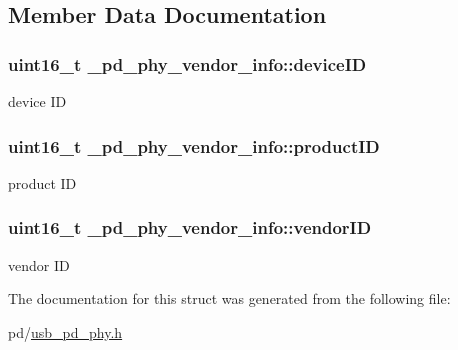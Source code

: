 \subsection{Member Data Documentation}
\hypertarget{struct__pd__phy__vendor__info_a356dba0c0968b8a08fee4477f561ea46}{
\subsubsection[{device\-I\-D}]{\setlength{\rightskip}{0pt plus 5cm}uint16\-\_\-t \-\_\-pd\-\_\-phy\-\_\-vendor\-\_\-info\-::device\-I\-D}}\label{struct__pd__phy__vendor__info_a356dba0c0968b8a08fee4477f561ea46}
device I\-D \hypertarget{struct__pd__phy__vendor__info_a4bd651a05bc50ad4e045b7956ba6f43b}{
\subsubsection[{product\-I\-D}]{\setlength{\rightskip}{0pt plus 5cm}uint16\-\_\-t \-\_\-pd\-\_\-phy\-\_\-vendor\-\_\-info\-::product\-I\-D}}\label{struct__pd__phy__vendor__info_a4bd651a05bc50ad4e045b7956ba6f43b}
product I\-D \hypertarget{struct__pd__phy__vendor__info_a271bbac00bad57c93a70cfb905bb2d98}{
\subsubsection[{vendor\-I\-D}]{\setlength{\rightskip}{0pt plus 5cm}uint16\-\_\-t \-\_\-pd\-\_\-phy\-\_\-vendor\-\_\-info\-::vendor\-I\-D}}\label{struct__pd__phy__vendor__info_a271bbac00bad57c93a70cfb905bb2d98}
vendor I\-D 

The documentation for this struct was generated from the following file\-:\begin{DoxyCompactItemize}
\item 
pd/\hyperlink{usb__pd__phy_8h}{usb\-\_\-pd\-\_\-phy.\-h}\end{DoxyCompactItemize}
